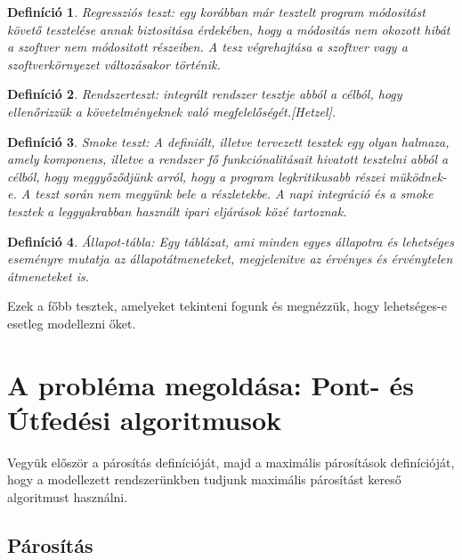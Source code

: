 \documentclass[12pt]{article}
\newtheorem{defin}{Definíció}[section]
\begin{document}
\begin{defin}
Regressziós teszt: egy korábban már tesztelt program módositást követő tesztelése annak biztositása érdekében, hogy a módositás nem okozott hibát a szoftver nem módositott részeiben. A tesz végrehajtása a szoftver vagy a szoftverkörnyezet változásakor történik. ~\cite{htb:masterfield}
\end{defin}

\begin{defin}
Rendszerteszt: integrált rendszer tesztje abból a célból, hogy ellenőrizzük a követelményeknek való megfelelőségét.[Hetzel]. ~\cite{htb:masterfield}
\end{defin}

\begin{defin}
Smoke teszt: A definiált, illetve tervezett tesztek egy olyan halmaza, amely komponens, illetve a rendszer fő funkciónalitásait hivatott tesztelni abból a célból, hogy meggyőződjünk arról, hogy a program legkritikusabb részei müködnek-e. A teszt során nem megyünk bele a részletekbe. A napi integráció és a smoke tesztek a leggyakrabban használt ipari eljárások közé tartoznak. ~\cite{htb:masterfield}
\end{defin}

\begin{defin}
Állapot-tábla: Egy táblázat, ami minden egyes állapotra és lehetséges eseményre mutatja az állapotátmeneteket, megjelenitve az érvényes és érvénytelen átmeneteket is. ~\cite{htb:masterfield}
\end{defin}

Ezek a főbb tesztek, amelyeket tekinteni fogunk és megnézzük, hogy lehetséges-e esetleg modellezni őket.\\

\pagebreak

\section{A probléma megoldása: Pont- és Útfedési algoritmusok}

Vegyük először a párosítás definícióját, majd a maximális párosítások definícióját, hogy a modellezett rendszerünkben tudjunk maximális párosítást kereső algoritmust használni.\\

\subsection{Párosítás}
\end{document}
